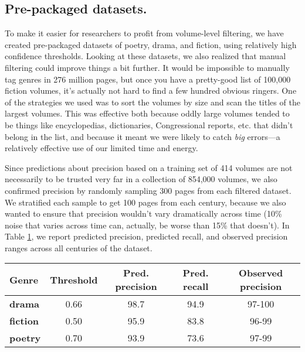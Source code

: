\documentclass[paper=a4, fontsize=12pt]{scrartcl}
\numberwithin{equation}{section}		%
\numberwithin{figure}{section}			%
\numberwithin{table}{section}				%
\begin{document}
\subsection{Pre-packaged datasets.}

To make it easier for researchers to profit from volume-level filtering, we have created pre-packaged datasets of poetry, drama, and fiction, using relatively high confidence thresholds. Looking at these datasets, we also realized that manual filtering could improve things a bit further. It would be impossible to manually tag genres in 276 million pages, but once you have a pretty-good list of 100,000 fiction volumes, it's actually not hard to find a few hundred obvious ringers. One of the strategies we used was to sort the volumes by size and scan the titles of the largest volumes. This was effective both because oddly large volumes tended to be things like encyclopedias, dictionaries, Congressional reports, etc. that didn't belong in the list, and because it meant we were likely to catch \textit{big} errors---a relatively effective use of our limited time and energy.

Since predictions about precision based on a training set of 414 volumes are not necessarily to be trusted very far in a collection of 854,000 volumes, we also confirmed precision by randomly sampling 300 pages from each filtered dataset. We stratified each sample to get 100 pages from each century, because we also wanted to ensure that precision wouldn't vary dramatically across time (10\% noise that varies across time can, actually, be worse than 15\% that doesn't). In Table \ref{filteredtable}, we report predicted precision, predicted recall, and observed precision ranges across all centuries of the dataset.

\vspace{5mm}
\begin{table}[h]
\begin{tabular}{@{}lcccc@{}}
\toprule
\textbf{Genre}   & \textbf{Threshold} & \textbf{Pred. precision} & \textbf{Pred. recall} & \textbf{Observed precision} \\ \midrule
\textbf{drama}   & 0.66               & 98.7                     & 94.9                  & 97-100                      \\
\textbf{fiction} & 0.50               & 95.9                     & 83.8                  & 96-99                       \\
\textbf{poetry}  & 0.70               & 93.9                     & 73.6                  & 97-99                      
\end{tabular}
\label{filteredtable}
\end{table}
\vspace{5mm}
\end{document}
